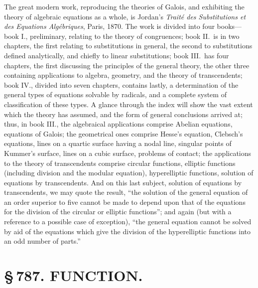 \documentclass[11pt,a4paper]{book}
\begin{document}
The great modern work, reproducing the theories of Galois, and exhibiting the theory of algebraic equations as a whole, is Jordan's \textit{Trait\'{e} des Substitutions et des Equations Alg\'{e}briques}, Paris, 1870. The work is divided into four books---book I., preliminary, relating to the theory of congruences; book II.\ is in two chapters, the first relating to substitutions in general, the second to substitutions defined analytically, and chiefly to linear substitutions; book III.\ has four chapters, the first discussing the principles of the general theory, the other three containing applications to algebra, geometry, and the theory of transcendents; book IV., divided into seven chapters, contains lastly, a determination of the general types of equations solvable by radicals, and a complete system of classification of these types. A glance through the index will show the vast extent which the theory has assumed, and the form of general conclusions arrived at; thus, in book III., the algebraical applications comprise Abelian equations, equations of Galois; the geometrical ones comprise Hesse's equation, Clebsch's equations, lines on a quartic surface having a nodal line, singular points of Kummer's surface, lines on a cubic surface, problems of contact; the applications to the theory of transcendents comprise circular functions, elliptic functions (including division and the modular equation), hyperelliptic functions, solution of equations by transcendents. And on this last subject, solution of equations by transcendents, we may quote the result, ``the solution of the general equation of an order superior to five cannot be made to depend upon that of the equations for the division of the circular or elliptic functions''; and again (but with a reference to a possible case of exception), ``the general equation cannot be solved by aid of the equations which give the division of the hyperelliptic functions into an odd number of parts.''

\newpage
\section*{\S\,787. FUNCTION.}


\smallskip
\end{document}
